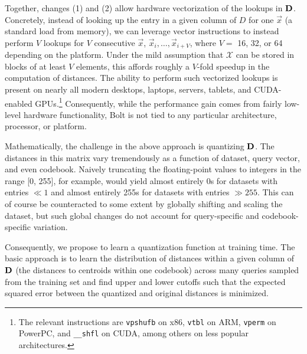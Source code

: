 Together, changes (1) and (2) allow hardware vectorization of the lookups in $\mathbf{D}$. Concretely, instead of looking up the entry in a given column of $D$ for one $\vec{x}$ (a standard load from memory), we can leverage vector instructions to instead perform $V$ lookups for $V$ consecutive $\vec{x}$, $\vec{x}_i,\ldots,\vec{x}_{i+V}$, where $V = $ 16, 32, or 64 depending on the platform. Under the mild assumption that $\mathcal{X}$ can be stored in blocks of at least $V$ elements, this affords roughly a $V$-fold speedup in the computation of distances. The ability to perform such vectorized lookups is present on nearly all modern desktops, laptops, servers, tablets, and CUDA-enabled GPUs.\footnote{The relevant instructions are \texttt{vpshufb} on x86, \texttt{vtbl} on ARM, \texttt{vperm} on PowerPC, and \texttt{\_\_shfl} on CUDA, among others on less popular architectures.} Consequently, while the performance gain comes from fairly low-level hardware functionality, Bolt is not tied to any particular architecture, processor, or platform.

Mathematically, the challenge in the above approach is quantizing $\mathbf{D}$. The distances in this matrix vary tremendously as a function of dataset, query vector, and even codebook. Naively truncating the floating-point values to integers in the range [0, 255], for example, would yield almost entirely 0s for datasets with entries $ \ll 1$ and almost entirely 255s for datasets with entries $ \gg 255$. This can of course be counteracted to some extent by globally shifting and scaling the dataset, but such global changes do not account for query-specific and codebook-specific variation.

Consequently, we propose to learn a quantization function at training time. The basic approach is to learn the distribution of distances within a given column of $\mathbf{D}$ (the distances to centroids within one codebook) across many queries sampled from the training set and find upper and lower cutoffs such that the expected squared error between the quantized and original distances is minimized.

